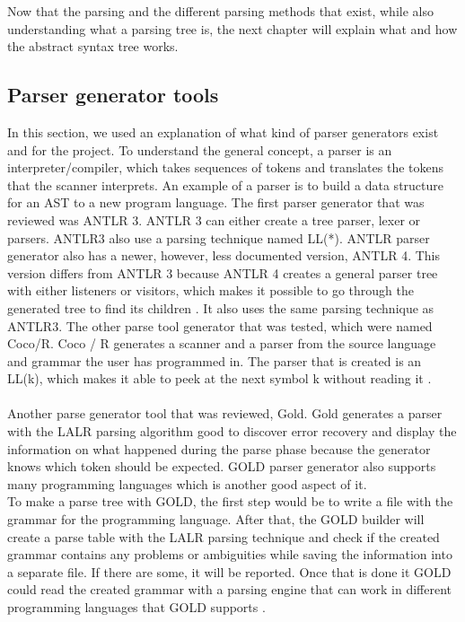 Now that the parsing and the different parsing methods that exist, while also understanding what a parsing tree is, the next chapter will explain what and how the abstract syntax tree works.

\subsection{Parser generator tools}
In this section, we used an explanation of what kind of parser generators exist and for the project. To understand the general concept, a parser is an interpreter/compiler, which takes sequences of tokens and translates the tokens that the scanner interprets. An example of a parser is to build a data structure for an AST to a new program language.
The first parser generator that was reviewed was ANTLR 3. ANTLR 3 can either create a tree parser, lexer or parsers. ANTLR3 also use a parsing technique named LL(*). ANTLR parser generator also has a newer, however, less documented version, ANTLR 4. This version differs from ANTLR 3 because ANTLR 4 creates a general parser tree with either listeners or visitors, which makes it possible to go through the generated tree to find its children \cite{ANTLR4-Why}. It also uses the same parsing technique as ANTLR3. The other parse tool generator that was tested, which were named Coco/R. Coco / R generates a scanner and a parser from the source language and grammar the user has programmed in. The parser that is created is an LL(k), which makes it able to peek at the next symbol k without reading it \cite{COCO/R}. \\
\\
Another parse generator tool that was reviewed, Gold. Gold generates a parser with the LALR parsing algorithm good to discover error recovery and display the information on what happened during the parse phase because the generator knows which token should be expected. GOLD parser generator also supports many programming languages which is another good aspect of it.\\
To make a parse tree with GOLD, the first step would be to write a file with the grammar for the programming language. After that, the GOLD builder will create a parse table with the LALR parsing technique and check if the created grammar contains any problems or ambiguities while saving the information into a separate file. If there are some, it will be reported. Once that is done it GOLD could read the created grammar with a parsing engine that can work in different programming languages that GOLD supports \cite{GOLD}. 
\\

